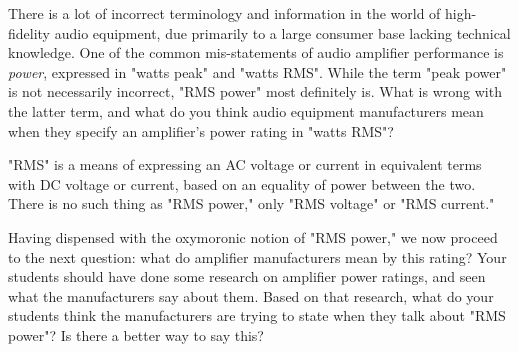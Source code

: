 

There is a lot of incorrect terminology and information in the world of high-fidelity audio equipment, due primarily to a large consumer base lacking technical knowledge.  One of the common mis-statements of audio amplifier performance is {\it power}, expressed in "watts peak" and "watts RMS".  While the term "peak power" is not necessarily incorrect, "RMS power" most definitely is.  What is wrong with the latter term, and what do you think audio equipment manufacturers mean when they specify an amplifier's power rating in "watts RMS"?







"RMS" is a means of expressing an AC voltage or current in equivalent terms with DC voltage or current, based on an equality of power between the two.  There is no such thing as "RMS power," only "RMS voltage" or "RMS current."







Having dispensed with the oxymoronic notion of "RMS power," we now proceed to the next question: what do amplifier manufacturers mean by this rating?  Your students should have done some research on amplifier power ratings, and seen what the manufacturers say about them.  Based on that research, what do your students think the manufacturers are trying to state when they talk about "RMS power"?  Is there a better way to say this?




